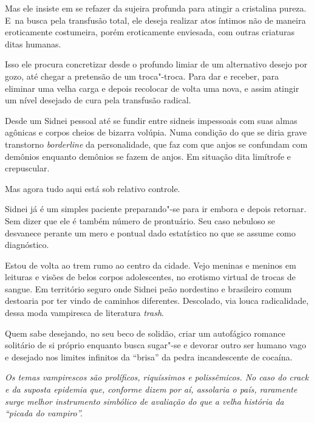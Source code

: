 Mas ele insiste em se refazer da sujeira profunda para atingir a
cristalina pureza. E~na busca pela transfusão total, ele deseja realizar
atos íntimos não de maneira eroticamente costumeira, porém eroticamente
enviesada, com outras criaturas ditas humanas.

Isso ele procura concretizar desde o profundo limiar de um alternativo
desejo por gozo, até chegar a pretensão de um troca"-troca. Para dar e
receber, para eliminar uma velha carga e depois recolocar de volta uma
nova, e assim atingir um nível desejado de cura pela transfusão radical.

Desde um Sidnei pessoal até se fundir entre sidneis impessoais com suas
almas agônicas e corpos cheios de bizarra volúpia. Numa condição do que
se diria grave transtorno \emph{borderline} da personalidade, que faz
com que anjos se confundam com demônios enquanto demônios se fazem de
anjos. Em situação dita limítrofe e crepuscular.

\asterisc{}

Mas agora tudo aqui está sob relativo controle.

Sidnei já é um simples paciente preparando"-se para ir embora e depois
retornar. Sem dizer que ele é também número de prontuário. Seu caso
nebuloso se desvanece perante um mero e pontual dado estatístico no que
se assume como diagnóstico.

\asterisc{}

Estou de volta ao trem rumo ao centro da cidade. Vejo meninas e meninos
em leituras e visões de belos corpos adolescentes, no erotismo virtual
de trocas de sangue. Em território seguro onde Sidnei peão nordestino e
brasileiro comum destoaria por ter vindo de caminhos diferentes.
Descolado, via louca radicalidade, dessa moda vampiresca de literatura
\emph{trash}.

Quem sabe desejando, no seu beco de solidão, criar um autofágico romance
solitário de si próprio enquanto busca sugar"-se e devorar outro ser
humano vago e desejado nos limites infinitos da ``brisa'' da pedra
incandescente de cocaína.

\begin{center}\asterisc{}\end{center}
\begingroup\small

\emph{Os temas vampirescos são prolíficos, riquíssimos e polissêmicos.
No caso do crack e da suposta epidemia que, conforme dizem por aí,
assolaria o país, raramente surge melhor instrumento simbólico de
avaliação do que a velha história da ``picada do vampiro''.}~

